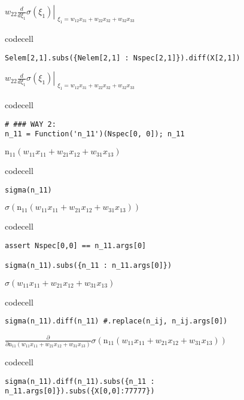$\displaystyle w_{22} \left. \frac{d}{d \xi_{1}} \sigma{\left(\xi_{1} \right)} \right|_{\substack{ \xi_{1}=w_{12} x_{31} + w_{22} x_{32} + w_{32} x_{33} }}$

codecell

\begin{verbatim}
Selem[2,1].subs({Nelem[2,1] : Nspec[2,1]}).diff(X[2,1])
\end{verbatim}

$\displaystyle w_{22} \left. \frac{d}{d \xi_{1}} \sigma{\left(\xi_{1} \right)} \right|_{\substack{ \xi_{1}=w_{12} x_{31} + w_{22} x_{32} + w_{32} x_{33} }}$

codecell

\begin{verbatim}
# ### WAY 2:
n_11 = Function('n_11')(Nspec[0, 0]); n_11
\end{verbatim}

$\displaystyle \operatorname{n_{11}}{\left(w_{11} x_{11} + w_{21} x_{12} + w_{31} x_{13} \right)}$

codecell

\begin{verbatim}
sigma(n_11)
\end{verbatim}

$\displaystyle \sigma{\left(\operatorname{n_{11}}{\left(w_{11} x_{11} + w_{21} x_{12} + w_{31} x_{13} \right)} \right)}$

codecell

\begin{verbatim}
assert Nspec[0,0] == n_11.args[0]

sigma(n_11).subs({n_11 : n_11.args[0]})
\end{verbatim}

$\displaystyle \sigma{\left(w_{11} x_{11} + w_{21} x_{12} + w_{31} x_{13} \right)}$

codecell

\begin{verbatim}
sigma(n_11).diff(n_11) #.replace(n_ij, n_ij.args[0])
\end{verbatim}

$\displaystyle \frac{\partial}{\partial \operatorname{n_{11}}{\left(w_{11} x_{11} + w_{21} x_{12} + w_{31} x_{13} \right)}} \sigma{\left(\operatorname{n_{11}}{\left(w_{11} x_{11} + w_{21} x_{12} + w_{31} x_{13} \right)} \right)}$

codecell

\begin{verbatim}
sigma(n_11).diff(n_11).subs({n_11 : n_11.args[0]}).subs({X[0,0]:77777})
\end{verbatim}

